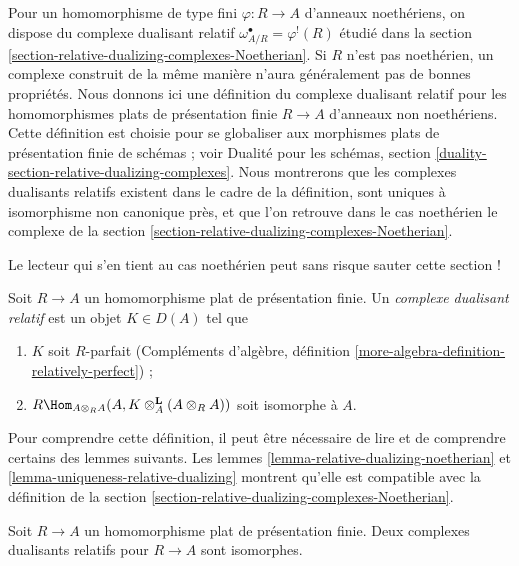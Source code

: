 \noindent
Pour un homomorphisme de type fini $\varphi : R \to A$ d'anneaux noethériens,
on dispose du complexe dualisant relatif $\omega_{A/R}^\bullet = \varphi^!(R)$ étudié dans la section \ref{section-relative-dualizing-complexes-Noetherian}.
Si $R$ n'est pas noethérien, un complexe construit de la même manière
n'aura généralement pas de bonnes propriétés.
Nous donnons ici une définition du complexe dualisant relatif
pour les homomorphismes plats de présentation finie $R \to A$
d'anneaux non noethériens. Cette définition est choisie pour se globaliser
aux morphismes plats de présentation finie de schémas ;
voir Dualité pour les schémas, section \ref{duality-section-relative-dualizing-complexes}.
Nous montrerons que les complexes dualisants relatifs existent
dans le cadre de la définition, sont uniques à isomorphisme non canonique près,
et que l'on retrouve dans le cas noethérien le complexe de la section \ref{section-relative-dualizing-complexes-Noetherian}.

\medskip\noindent
Le lecteur qui s'en tient au cas noethérien peut sans risque sauter cette section !

\begin{definition}
\label{definition-relative-dualizing-complex}
Soit $R \to A$ un homomorphisme plat de présentation finie.
Un {\it complexe dualisant relatif} est un objet $K \in D(A)$ tel que
\begin{enumerate}
\item $K$ soit $R$-parfait (Compléments d'algèbre, définition \ref{more-algebra-definition-relatively-perfect}) ;
\item $R\Hom_{A \otimes_R A}(A, K \otimes_A^\mathbf{L} (A \otimes_R A))$ soit isomorphe à $A$.
\end{enumerate}
\end{definition}

\noindent
Pour comprendre cette définition, il peut être nécessaire de lire
et de comprendre certains des lemmes suivants.
Les lemmes \ref{lemma-relative-dualizing-noetherian} et \ref{lemma-uniqueness-relative-dualizing} montrent qu'elle est compatible
avec la définition de la section \ref{section-relative-dualizing-complexes-Noetherian}.

\begin{lemma}
\label{lemma-uniqueness-relative-dualizing}
Soit $R \to A$ un homomorphisme plat de présentation finie.
Deux complexes dualisants relatifs pour $R \to A$ sont isomorphes.
\end{lemma}

